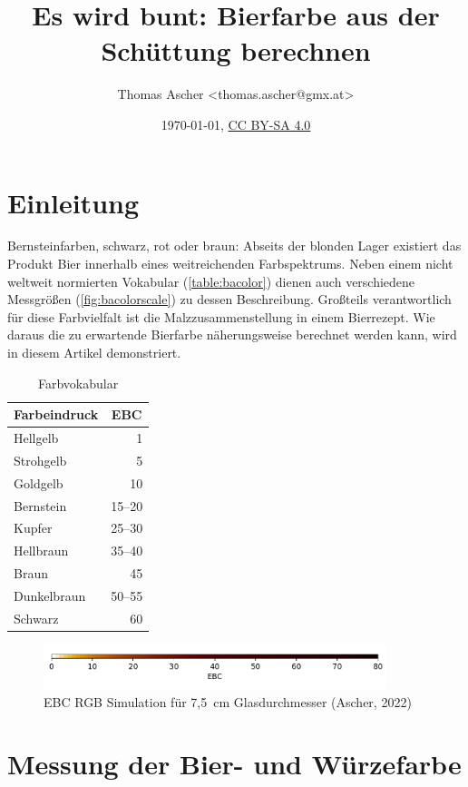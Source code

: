 \documentclass[a4paper,parskip=half]{scrartcl}
\title{Es wird bunt: Bierfarbe aus der Schüttung berechnen}
\author{Thomas Ascher <thomas.ascher@gmx.at>}
\date{\today, \href{http://creativecommons.org/licenses/by-sa/4.0/}{CC BY-SA 4.0}}
\begin{document}
\maketitle

\section*{Einleitung}

Bernsteinfarben, schwarz, rot oder braun: Abseits der blonden Lager existiert das Produkt Bier innerhalb eines weitreichenden Farbspektrums. Neben einem nicht weltweit normierten Vokabular (\autoref{table:bacolor}) dienen auch verschiedene Messgrößen (\autoref{fig:bacolorscale}) zu dessen Beschreibung. Großteils verantwortlich für diese Farbvielfalt ist die Malzzusammenstellung in einem Bierrezept. Wie daraus die zu erwartende Bierfarbe näherungsweise berechnet werden kann, wird in diesem Artikel demonstriert.

\begin{table}[H]
\centering
\begin{tabular}{lr}
\toprule
\multicolumn{1}{c}{\textbf{Farbeindruck}} & \multicolumn{1}{c}{\textbf{EBC}} \\
\midrule
Hellgelb & 1 \\
Strohgelb & 5 \\
Goldgelb & 10 \\
Bernstein & 15–20 \\
Kupfer & 25–30 \\
Hellbraun & 35–40 \\
Braun & 45 \\
Dunkelbraun & 50–55 \\
Schwarz & 60 \\
\bottomrule
\end{tabular}
\caption{Farbvokabular \parencite[34]{Bruecklmeier2018}}
\label{table:bacolor}
\end{table}

\begin{figure}[h]
\centering
\includegraphics[width=10cm]{colorscale.pdf}
\caption{EBC RGB Simulation für 7,5~cm Glasdurchmesser (Ascher, 2022)}
\label{fig:bacolorscale}
\end{figure}

\section*{Messung der Bier- und Würzefarbe}
\end{document}
